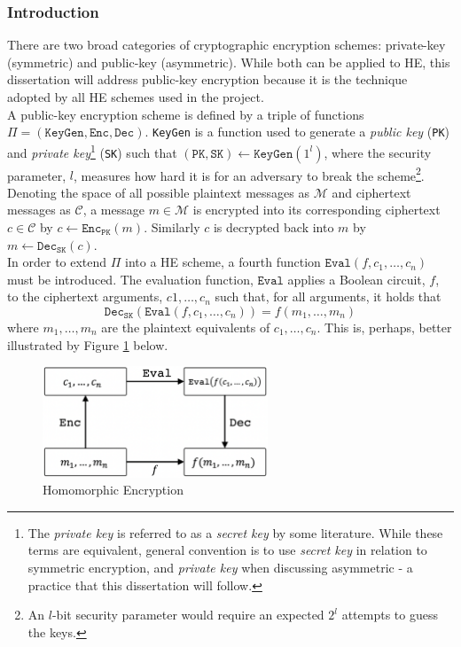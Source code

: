 \subsubsection{Introduction}
\setlength{\leftskip}{0.5cm}
\indent \indent
There are two broad categories of cryptographic encryption schemes: private-key (symmetric) and public-key (asymmetric). While both can be applied to HE, this dissertation will address public-key encryption because it is the technique adopted by all HE schemes used in the project.
\smallskip \\ \indent
A public-key encryption scheme is defined by a triple of functions $\Pi = (\texttt{KeyGen}, \texttt{Enc}, \texttt{Dec})$. \texttt{KeyGen} is a function used to generate a \textit{public key} (\texttt{PK}) and \textit{private key}\footnote{The \textit{private key} is referred to as a \textit{secret key} by some literature. While these terms are equivalent, general convention is to use \textit{secret key} in relation to symmetric encryption, and \textit{private key} when discussing asymmetric - a practice that this dissertation will follow.} (\texttt{SK}) such that $(\texttt{PK}, \texttt{SK}) \leftarrow \texttt{KeyGen}(1^l)$, where the security parameter, $l$, measures how hard it is for an adversary to break the scheme\footnote{An $l$-bit security parameter would require an expected $2^l$ attempts to guess the keys.}. Denoting the space of all possible plaintext messages as $\mathcal{M}$ and ciphertext messages as $\mathcal{C}$, a message $m \in \mathcal{M}$ is encrypted into its corresponding ciphertext $c \in \mathcal{C}$ by $c \leftarrow \texttt{Enc}_\texttt{PK}(m)$. Similarly $c$ is decrypted back into $m$ by $m \leftarrow \texttt{Dec}_\texttt{SK}(c)$.
\smallskip \\ \indent
In order to extend $\Pi$ into a HE scheme, a fourth function $\texttt{Eval}(f, c_1, \ldots, c_n)$ must be introduced. The evaluation function, $\texttt{Eval}$ applies a Boolean circuit, $f$, to the ciphertext arguments, $c1, \ldots, c_n$ such that, for all arguments, it holds that
\begin{equation}
    \texttt{Dec}_\texttt{SK}(\texttt{Eval}(f, c_1, \ldots, c_n)) = f(m_1, \ldots, m_n)
\end{equation}
where $m_1, \ldots, m_n$ are the plaintext equivalents of $c_1, \ldots, c_n$. This is, perhaps, better illustrated by Figure \ref{fig:homomorphicEncryption} below.

\begin{figure}[ht]
    \centering
    \includegraphics[width=0.6\textwidth]{figures/homomorphicEncryption.png}
    \caption[Homomorphic Encryption]{Homomorphic Encryption}
    \label{fig:homomorphicEncryption}
\end{figure}

